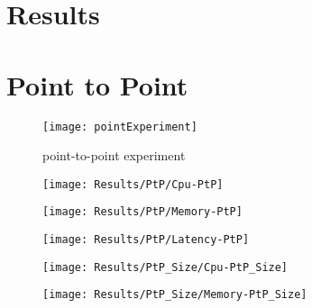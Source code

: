 
%

\section{Results} %
\label{sec:results}


\section{Point to Point} %
\label{sec:point to point}

\begin{figure}[htbp]
    \centering
    \texttt{[image: pointExperiment]}
    \caption{point-to-point experiment}
    \label{fig:gantt}
\end{figure}


\begin{figure}[htbp]
    \centering
    \texttt{[image: Results/PtP/Cpu-PtP]}
    \label{fig:gantt}
\end{figure}

\begin{figure}[htbp]
    \centering
    \texttt{[image: Results/PtP/Memory-PtP]}
    \label{fig:gantt}
\end{figure}

\begin{figure}[htbp]
    \centering
    \texttt{[image: Results/PtP/Latency-PtP]}
    \label{fig:gantt}
\end{figure}

\begin{figure}[htbp]
    \centering
    \texttt{[image: Results/PtP\_Size/Cpu-PtP\_Size]}
    \label{fig:gantt}
\end{figure}

\begin{figure}[htbp]
    \centering
    \texttt{[image: Results/PtP\_Size/Memory-PtP\_Size]}
    \label{fig:gantt}
\end{figure}

